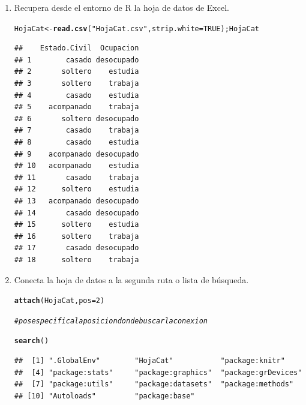\documentclass[12pt,letterpaper]{article}\usepackage[]{graphicx}\usepackage[]{color}
\makeatletter
\newcommand{\hlnum}[1]{\textcolor[rgb]{0.686,0.059,0.569}{#1}}%
\newcommand{\hlstr}[1]{\textcolor[rgb]{0.192,0.494,0.8}{#1}}%
\newcommand{\hlcom}[1]{\textcolor[rgb]{0.678,0.584,0.686}{\textit{#1}}}%
\newcommand{\hlstd}[1]{\textcolor[rgb]{0.345,0.345,0.345}{#1}}%
\newcommand{\hlkwb}[1]{\textcolor[rgb]{0.69,0.353,0.396}{#1}}%
\newcommand{\hlkwc}[1]{\textcolor[rgb]{0.333,0.667,0.333}{#1}}%
\newcommand{\hlkwd}[1]{\textcolor[rgb]{0.737,0.353,0.396}{\textbf{#1}}}%
\newenvironment{kframe}{%
 \def\at@end@of@kframe{}%
 \ifinner\ifhmode%
  \def\at@end@of@kframe{\end{minipage}}%
  \begin{minipage}{\columnwidth}%
 \fi\fi%
 \def\FrameCommand##1{\hskip\@totalleftmargin \hskip-\fboxsep
 \colorbox{shadecolor}{##1}\hskip-\fboxsep
     \hskip-\linewidth \hskip-\@totalleftmargin \hskip\columnwidth}%
 \MakeFramed {\advance\hsize-\width
   \@totalleftmargin\z@ \linewidth\hsize
   \@setminipage}}%
 {\par\unskip\endMakeFramed%
 \at@end@of@kframe}
\newenvironment{knitrout}{}{} %
\makeatother
\begin{document}
\begin{enumerate}
\item Recupera desde el entorno de R la hoja de datos de Excel.
\begin{knitrout}
\color{fgcolor}\begin{kframe}
\begin{alltt}
\hlstd{HojaCat} \hlkwb{<-} \hlkwd{read.csv}\hlstd{(}\hlstr{"HojaCat.csv"}\hlstd{,} \hlkwc{strip.white}\hlstd{=}\hlnum{TRUE}\hlstd{);HojaCat}
\end{alltt}
\begin{verbatim}
##    Estado.Civil  Ocupacion
## 1        casado desocupado
## 2       soltero    estudia
## 3       soltero    trabaja
## 4        casado    estudia
## 5    acompanado    trabaja
## 6       soltero desocupado
## 7        casado    trabaja
## 8        casado    estudia
## 9    acompanado desocupado
## 10   acompanado    estudia
## 11       casado    trabaja
## 12      soltero    estudia
## 13   acompanado desocupado
## 14       casado desocupado
## 15      soltero    estudia
## 16      soltero    trabaja
## 17       casado desocupado
## 18      soltero    trabaja
\end{verbatim}
\end{kframe}
\end{knitrout}

\item Conecta la hoja de datos a la segunda ruta o lista de b\'usqueda.
\begin{knitrout}
\color{fgcolor}\begin{kframe}
\begin{alltt}
\hlkwd{attach}\hlstd{(HojaCat,} \hlkwc{pos}\hlstd{=}\hlnum{2}\hlstd{)}

\hlcom{# pos especifica la posicion donde buscar la conexion }

\hlkwd{search}\hlstd{()}
\end{alltt}
\begin{verbatim}
##  [1] ".GlobalEnv"        "HojaCat"           "package:knitr"    
##  [4] "package:stats"     "package:graphics"  "package:grDevices"
##  [7] "package:utils"     "package:datasets"  "package:methods"  
## [10] "Autoloads"         "package:base"
\end{verbatim}
\end{kframe}
\end{knitrout}


\end{enumerate}
\end{document}

